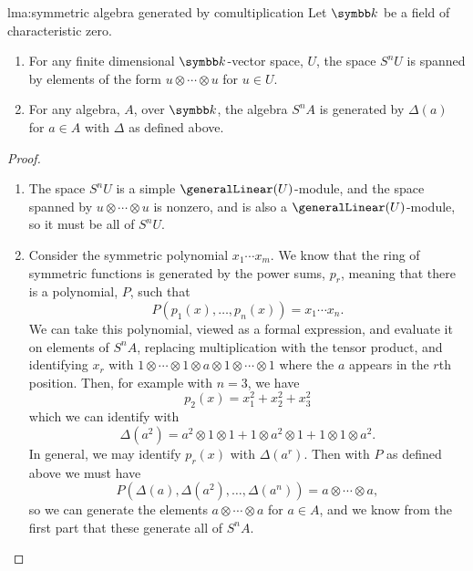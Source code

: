 \begin{lma}{}{lma:symmetric algebra generated by comultiplication}
    Let \(\field\) be a field of characteristic zero.
    \begin{enumerate}
        \item For any finite dimensional \(\field\)-vector space, \(U\), the space \(S^nU\) is spanned by elements of the form \(u \otimes \dotsb \otimes u\) for \(u \in U\).
        \item For any algebra, \(A\), over \(\field\), the algebra \(S^nA\) is generated by \(\Delta(a)\) for \(a \in A\) with \(\Delta\) as defined above.
    \end{enumerate}
    \begin{proof}
        \begin{enumerate}
            \item The space \(S^nU\) is a simple \(\generalLinear(U)\)-module, and the space spanned by \(u \otimes \dotsb \otimes u\) is nonzero, and is also a \(\generalLinear(U)\)-module, so it must be all of \(S^nU\).
            \item Consider the symmetric polynomial \(x_1 \dotsm x_m\).
            We know that the ring of symmetric functions is generated by the power sums, \(p_r\), meaning that there is a polynomial, \(P\), such that
            \begin{equation}
                P(p_1(x), \dotsc, p_n(x)) = x_1 \dotsm x_n.
            \end{equation}
            We can take this polynomial, viewed as a formal expression, and evaluate it on elements of \(S^nA\), replacing multiplication with the tensor product, and identifying \(x_r\) with \(1 \otimes \dotsb \otimes 1 \otimes a \otimes 1 \otimes \dotsb \otimes 1\) where the \(a\) appears in the \(r\)th position.
            Then, for example with \(n = 3\), we have
            \begin{equation}
                p_2(x) = x_1^2 + x_2^2 + x_3^2
            \end{equation}
            which we can identify with
            \begin{equation}
                \Delta(a^2) = a^2 \otimes 1 \otimes 1 + 1 \otimes a^2 \otimes 1 + 1 \otimes 1 \otimes a^2.
            \end{equation}
            In general, we may identify \(p_r(x)\) with \(\Delta(a^r)\).
            Then with \(P\) as defined above we must have
            \begin{equation}
                P(\Delta(a), \Delta(a^2), \dotsc, \Delta(a^n)) = a \otimes \dotsb \otimes a,
            \end{equation}
            so we can generate the elements \(a \otimes \dotsb \otimes a\) for \(a \in A\), and we know from the first part that these generate all of \(S^nA\).
        \end{enumerate}
    \end{proof}
\end{lma}

